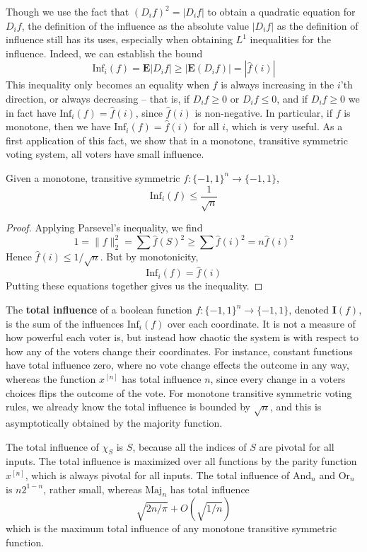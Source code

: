 Though we use the fact that $(D_if)^2 = |D_if|$ to obtain a quadratic equation for $D_i f$, the definition of the influence as the absolute value $|D_if|$ as the definition of influence still has its uses, especially when obtaining $L^1$ inequalities for the influence. Indeed, we can establish the bound
%
\[ \text{Inf}_i(f) = \mathbf{E}|D_if| \geq \left| \mathbf{E}(D_i f) \right| = | \widehat{f}(i) | \]
%
This inequality only becomes an equality when $f$ is always increasing in the $i$'th direction, or always decreasing -- that is, if $D_i f \geq 0$ or $D_i f \leq 0$, and if $D_i f \geq 0$ we in fact have $\text{Inf}_i(f) = \widehat{f}(i)$, since $\widehat{f}(i)$ is non-negative. In particular, if $f$ is monotone, then we have $\text{Inf}_i(f) = \widehat{f}(i)$ for all $i$, which is very useful. As a first application of this fact, we show that in a monotone, transitive symmetric voting system, all voters have small influence.

\begin{theorem}
    Given a monotone, transitive symmetric $f: \{ -1, 1 \}^n \to \{ -1, 1 \}$,
    \[ \text{Inf}_i(f) \leq \frac{1}{\sqrt{n}} \]
\end{theorem}
\begin{proof}
    Applying Parsevel's inequality, we find
    \[ 1 = \| f \|_2^2 = \sum \widehat{f}(S)^2 \geq \sum \widehat{f}(i)^2 = n \widehat{f}(i)^2 \]
    Hence $\widehat{f}(i) \leq 1/\sqrt{n}$. But by monotonicity,
    \[ \text{Inf}_i(f) = \widehat{f}(i) \]
    Putting these equations together gives us the inequality.
\end{proof}

The {\bf total influence} of a boolean function $f: \{ -1, 1 \}^n \to \{ -1, 1 \}$, denoted $\mathbf{I}(f)$, is the sum of the influences $\text{Inf}_i(f)$ over each coordinate. It is not a measure of how powerful each voter is, but instead how chaotic the system is with respect to how any of the voters change their coordinates. For instance, constant functions have total influence zero, where no vote change effects the outcome in any way, whereas the function $x^{[n]}$ has total influence $n$, since every change in a voters choices flips the outcome of the vote. For monotone transitive symmetric voting rules, we already know the total influence is bounded by $\sqrt{n}$, and this is asymptotically obtained by the majority function.

\begin{example}
    The total influence of $\chi_S$ is $S$, because all the indices of $S$ are pivotal for all inputs. The total influence is maximized over all functions by the parity function $x^{[n]}$, which is always pivotal for all inputs. The total influence of $\text{And}_n$ and $\text{Or}_n$ is $n2^{1-n}$, rather small, whereas $\text{Maj}_n$ has total influence
    \[ \sqrt{2n/\pi} + O \left( \sqrt{1/n} \right) \]
    which is the maximum total influence of any monotone transitive symmetric function.
\end{example}

